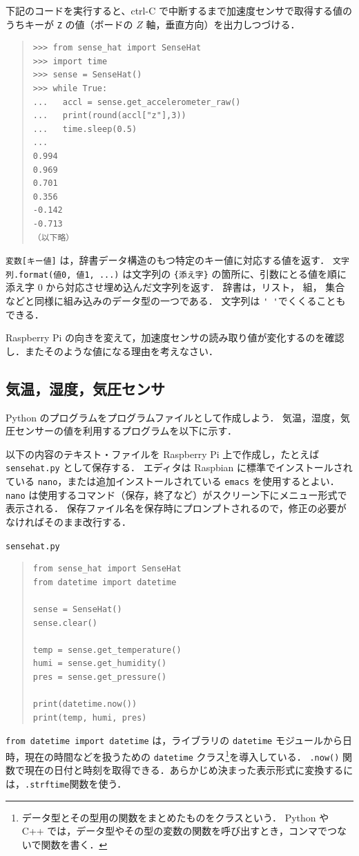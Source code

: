 \documentclass[11pt,a4,epsf]{article}
\begin{document}
下記のコードを実行すると、ctrl-C で中断するまで加速度センサで取得する値のうちキーが \verb+Z+ の値（ボードの $Z$ 軸，垂直方向）を出力しつづける．
\begin{quote}
\small
\begin{verbatim}
>>> from sense_hat import SenseHat 
>>> import time
>>> sense = SenseHat() 
>>> while True:
...   accl = sense.get_accelerometer_raw()
...   print(round(accl["z"],3))
...   time.sleep(0.5)
... 
0.994
0.969
0.701
0.356
-0.142
-0.713
（以下略）
\end{verbatim}
\end{quote}
\verb+変数[キー値]+ は，辞書データ構造のもつ特定のキー値に対応する値を返す．
\verb+文字列.format(値0, 値1, ...)+ は文字列の \verb+{添え字}+ の箇所に、引数にとる値を順に添え字 0 から対応させ埋め込んだ文字列を返す．
辞書は，リスト， 組， 集合などと同様に組み込みのデータ型の一つである．
文字列は \verb+' '+でくくることもできる．

\begin{excercise}
Raspberry Pi の向きを変えて，加速度センサの読み取り値が変化するのを確認し．またそのような値になる理由を考えなさい．
\end{excercise}

\subsection{気温，湿度，気圧センサ}

Python のプログラムをプログラムファイルとして作成しよう．
気温，湿度，気圧センサーの値を利用するプログラムを以下に示す．

以下の内容のテキスト・ファイルを Raspberry Pi 上で作成し，たとえば \verb+sensehat.py+ として保存する．
エディタは Raspbian に標準でインストールされている \verb+nano+，または追加インストールされている \verb+emacs+ を使用するとよい．
\verb+nano+ は使用するコマンド（保存，終了など）がスクリーン下にメニュー形式で表示される．
保存ファイル名を保存時にプロンプトされるので，修正の必要がなければそのまま改行する．
 \begin{itembox}[l]{\tt sensehat.py}
\begin{quote}
\small
\begin{verbatim}
from sense_hat import SenseHat
from datetime import datetime

sense = SenseHat()
sense.clear()

temp = sense.get_temperature()
humi = sense.get_humidity()
pres = sense.get_pressure()
    
print(datetime.now())
print(temp, humi, pres)
\end{verbatim}
\end{quote}
\end{itembox}
\verb+from datetime import datetime+ は，ライブラリの \verb+datetime+ モジュールから日時，現在の時間などを扱うための \verb+datetime+ クラス\footnote{データ型とその型用の関数をまとめたものをクラスという． Python や C++ では，データ型やその型の変数の関数を呼び出すとき，コンマでつないで関数を書く．}を導入している．
\verb+.now()+ 関数で現在の日付と時刻を取得できる．あらかじめ決まった表示形式に変換するには，\verb+.strftime+関数を使う．
\end{document}
